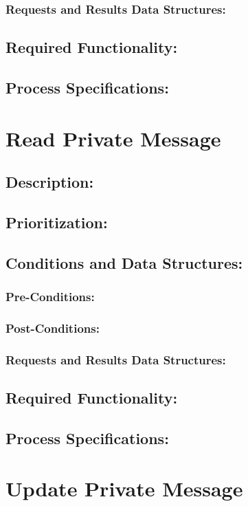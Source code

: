 \documentclass[a4paper,11pt]{article}
\begin{document}
\subsubsection*{Requests and Results Data Structures:}
\subsection{Required Functionality:} 
\subsection{Process Specifications:} 

\section{Read Private Message}
\subsection*{Description:}
\subsection{Prioritization:} 
\subsection{Conditions and Data Structures:}
\subsubsection*{Pre-Conditions:}
\subsubsection*{Post-Conditions:}
\subsubsection*{Requests and Results Data Structures:}
\subsection{Required Functionality:} 
\subsection{Process Specifications:} 

\section{Update Private Message}
\end{document}
